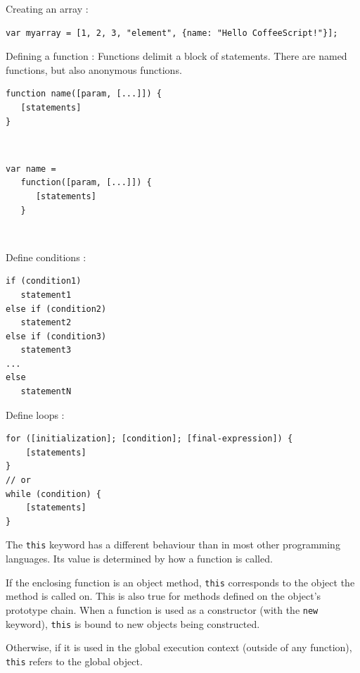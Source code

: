 \documentclass[a4paper,10pt]{article}
\begin{document}
Creating an array :
\begin{lstlisting}
var myarray = [1, 2, 3, "element", {name: "Hello CoffeeScript!"}];
\end{lstlisting}

Defining a function :
Functions delimit a block of statements.
There are named functions, but also anonymous functions.


\begin{minipage}[c]{.5\linewidth}
   \begin{lstlisting}[title=Named function,captionpos=t]
function name([param, [...]]) {
   [statements]
}
  \end{lstlisting}
~\\

\end{minipage} \hfill
\begin{minipage}[c]{.5\linewidth}
   \begin{lstlisting}[title=Anonymous function,captionpos=t]
var name =
   function([param, [...]]) {
      [statements]
   }
\end{lstlisting}
~\\

\end{minipage}


Define conditions :

\begin{lstlisting}
if (condition1)
   statement1
else if (condition2)
   statement2
else if (condition3)
   statement3
...
else
   statementN
\end{lstlisting}

Define loops :

\begin{lstlisting}
for ([initialization]; [condition]; [final-expression]) {
    [statements]
}
// or
while (condition) {
    [statements]
}
\end{lstlisting}


The \lstinline|this| keyword has a different behaviour than in most other programming languages.
Its value is determined by how a function is called.

If the enclosing function is an object method, \lstinline|this| corresponds to the object the method is called on. This is also true for methods defined on the object’s prototype chain. When a function is used as a constructor (with the \lstinline|new| keyword), \lstinline|this| is bound to new objects being constructed.

Otherwise, if it is used in the global execution context (outside of any function), \lstinline|this| refers to the global object.
\end{document}
